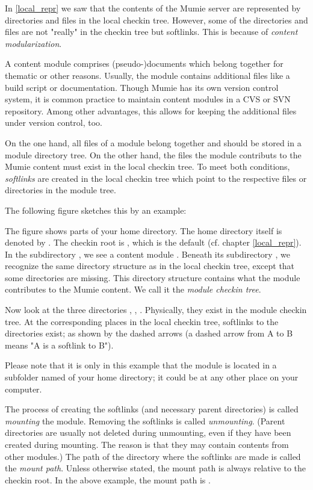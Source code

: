 \documentclass{generic}
\begin{document}
In \ref{local_repr} we saw that the contents of the Mumie server are
represented by directories and files in the local checkin tree. However, some
of the directories and files are not "really" in the checkin tree but
softlinks. This is because of \emph{content modularization}.

A content module comprises (pseudo-)documents which belong together for
thematic or other reasons. Usually, the module contains additional files
like a build script or documentation. Though Mumie has its own version control
system, it is common practice to maintain content modules in a CVS or SVN
repository. Among other advantages, this allows for keeping the additional
files under version control, too.

On the one hand, all files of a module belong together and should be stored in
a module directory tree. On the other hand, the files the module contributs to
the Mumie content must exist in the local checkin tree. To meet both
conditions, \emph{softlinks} are created in the local checkin tree which point
to the respective files or directories in the module tree.

The following figure sketches this by an example:


The figure shows parts of your home directory. The home directory itself is
denoted by . The checkin root is
, which is the default (cf. chapter
\ref{local_repr}). In the subdirectory , we see a content module
. Beneath its subdirectory , we recognize the
same directory structure as in the local checkin tree, except that some
directories are missing. This directory structure contains what the module
contributes to the Mumie content. We call it the \emph{module checkin tree}.

Now look at the three directories  , , .
Physically, they exist in the module checkin tree. At the corresponding places in
the local checkin tree, softlinks to the directories exist; as shown by the dashed
arrows (a dashed arrow from A to B means "A is a softlink to B").

Please note that it is only in this example that the module is located in a subfolder
named  of your home directory; it could be at any other place on your
computer.

The process of creating the softlinks (and necessary parent directories) is called
\emph{mounting} the module. Removing the softlinks is called \emph{unmounting}. (Parent
directories are usually not deleted during unmounting, even if they have been created during
mounting. The reason is that they may contain contents from other modules.) The path of the
directory where the softlinks are made is called the \emph{mount path}. Unless otherwise
stated, the mount path is always relative to the checkin root. In the above example, the
mount path is . 
\end{document}

